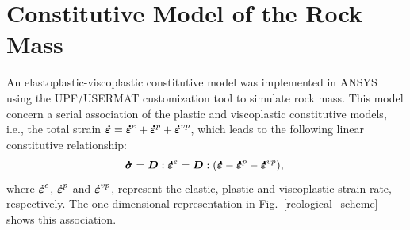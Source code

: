 \documentclass[a4paper,fleqn]{cas-sc}
\begin{document}

%	

\section{Constitutive Model of the Rock Mass}\label{}

An elastoplastic-viscoplastic constitutive model was implemented in ANSYS using the UPF/USERMAT customization tool to simulate rock mass.  This model concern a serial association of the plastic and viscoplastic constitutive models, i.e., the total strain $\boldsymbol{\dot{\varepsilon}} = \boldsymbol{\dot{\varepsilon}}^{e} + \boldsymbol{\dot{\varepsilon}}^{p} + \boldsymbol{\dot{\varepsilon}}^{vp}$, which leads to the following linear constitutive relationship:
\begin{equation} \label{eq_constitutive_relationship_epvp}
	\boldsymbol{\dot{\sigma}} = \boldsymbol{D} : \boldsymbol{\dot{\varepsilon}}^{e} = \boldsymbol{D} : (\boldsymbol{\dot{\varepsilon}} - \boldsymbol{\dot{\varepsilon}}^{p} - \boldsymbol{\dot{\varepsilon}}^{vp}),\;
\end{equation}
where $\boldsymbol{\dot{\varepsilon}}^{e}$, $\boldsymbol{\dot{\varepsilon}}^{p}$ and $\boldsymbol{\dot{\varepsilon}}^{vp}$, represent the elastic, plastic and viscoplastic strain rate, respectively. The one-dimensional representation in Fig.~\ref{reological_scheme} shows this association. 
\end{document}
